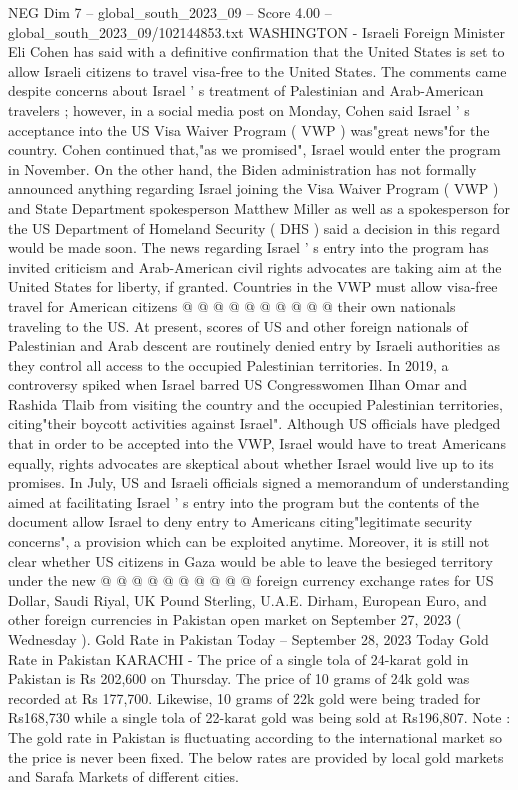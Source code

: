 \begin{textsample}{NEG Dim 7 – global\_south\_2023\_09 – Score 4.00 – global\_south\_2023\_09/102144853.txt}  \label{ex:f7_neg_334}
WASHINGTON - Israeli Foreign Minister Eli Cohen has said with a definitive confirmation that the United States is set to allow Israeli citizens to travel visa-free to the United States.
The comments came despite concerns about Israel ' s treatment of Palestinian and Arab-American travelers ; however, in a social media post on Monday, Cohen said Israel ' s acceptance into the US Visa Waiver Program ( VWP ) was"great news"for the country.
Cohen continued that,"as we promised", Israel would enter the program in November.
On the other hand, the Biden administration has not formally announced anything regarding Israel joining the Visa Waiver Program ( VWP ) and State Department spokesperson Matthew Miller as well as a spokesperson for the US Department of Homeland Security ( DHS ) said a decision in this regard would be made soon.
The news regarding Israel ' s entry into the program has invited criticism and Arab-American civil rights advocates are taking aim at the United States for liberty, if granted.
Countries in the VWP must allow visa-free travel for American citizens @ @ @ @ @ @ @ @ @ @ their own nationals traveling to the US.
At present, scores of US and other foreign nationals of Palestinian and Arab descent are routinely denied entry by Israeli authorities as they control all access to the occupied Palestinian territories.
In 2019, a controversy spiked when Israel barred US Congresswomen Ilhan Omar and Rashida Tlaib from visiting the country and the occupied Palestinian territories, citing"their boycott activities against Israel".
Although US officials have pledged that in order to be accepted into the VWP, Israel would have to treat Americans equally, rights advocates are skeptical about whether Israel would live up to its promises.
In July, US and Israeli officials signed a memorandum of understanding aimed at facilitating Israel ' s entry into the program but the contents of the document allow Israel to deny entry to Americans citing"legitimate security concerns", a provision which can be exploited anytime.
Moreover, it is still not clear whether US citizens in Gaza would be able to leave the besieged territory under the new @ @ @ @ @ @ @ @ @ @ foreign currency exchange rates for US Dollar, Saudi Riyal, UK Pound Sterling, U.A.E.
Dirham, European Euro, and other foreign currencies in Pakistan open market on September 27, 2023 ( Wednesday ).
Gold Rate in Pakistan Today -- September 28, 2023 Today Gold Rate in Pakistan KARACHI - The price of a single tola of 24-karat gold in Pakistan is Rs 202,600 on Thursday.
The price of 10 grams of 24k gold was recorded at Rs 177,700.
Likewise, 10 grams of 22k gold were being traded for Rs168,730 while a single tola of 22-karat gold was being sold at Rs196,807.
Note : The gold rate in Pakistan is fluctuating according to the international market so the price is never been fixed.
The below rates are provided by local gold markets and Sarafa Markets of different cities.

\end{textsample}
